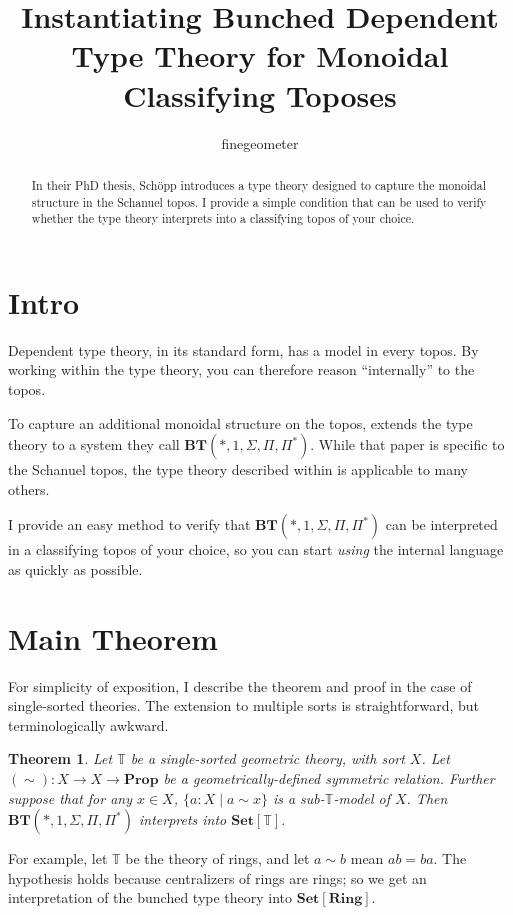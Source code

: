 \documentclass{article}
\title{Instantiating Bunched Dependent Type Theory for Monoidal Classifying Toposes}
\author{finegeometer}
\newtheorem{theorem}{Theorem}[section]
\newcommand*{\Prop}{\mathbf{Prop}}
\newcommand*{\Set}{\mathbf{Set}}
\newcommand*{\Ring}{\mathbf{Ring}}
\newcommand*{\T}{\mathbb{T}}
\begin{document}
\maketitle

\begin{abstract}
    In their PhD thesis, Sch\"opp introduces a type theory designed to capture the monoidal structure in the Schanuel topos.
    I provide a simple condition that can be used to verify whether the type theory interprets into a classifying topos of your choice.
\end{abstract}

\section{Intro}

Dependent type theory, in its standard form, has a model in every topos.
By working within the type theory, you can therefore reason ``internally'' to the topos.

To capture an additional monoidal structure on the topos,
\cite{schopp} extends the type theory to a system they call \(\mathbf{BT}(*, 1, \Sigma, \Pi, \Pi^*)\).
While that paper is specific to the Schanuel topos, the type theory described within is applicable to many others.

I provide an easy method to verify that \(\mathbf{BT}(*, 1, \Sigma, \Pi, \Pi^*)\)
can be interpreted in a classifying topos of your choice,
so you can start \emph{using} the internal language as quickly as possible.

\section{Main Theorem}

For simplicity of exposition, I describe the theorem and proof in the case of single-sorted theories.
The extension to multiple sorts is straightforward, but terminologically awkward.

\begin{theorem}
    Let \(\T\) be a single-sorted geometric theory, with sort \(X\).
    Let \((\sim) : X \to X \to \Prop\) be a geometrically-defined symmetric relation.
    Further suppose that for any \(x \in X\), \(\{a : X \mid a \sim x\}\) is a sub-\(\T\)-model of \(X\).
    Then \(\mathbf{BT}(*, 1, \Sigma, \Pi, \Pi^*)\) interprets into \(\Set[\T]\).
\end{theorem}

For example, let \(\T\) be the theory of rings, and let \(a \sim b\) mean \(ab = ba\).
The hypothesis holds because centralizers of rings are rings;
so we get an interpretation of the bunched type theory into \(\Set[\Ring]\).
\end{document}
